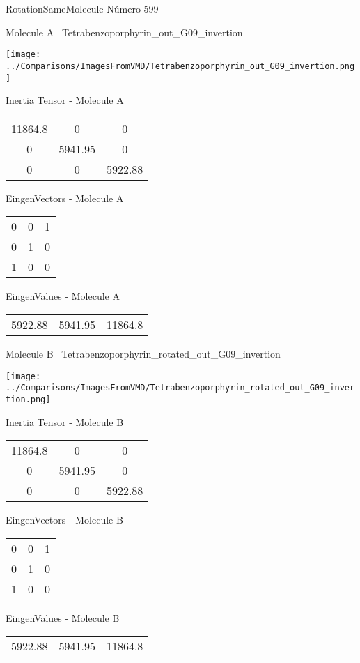 \vtab[-3cm]
\begin{center}
{\large RotationSameMolecule \tab Número 599}
\end{center}
\begin{multicols}{2}
\begin{center}

Molecule A \
Tetrabenzoporphyrin\_out\_G09\_invertion

\texttt{[image: ../Comparisons/ImagesFromVMD/Tetrabenzoporphyrin\_out\_G09\_invertion.png]}

Inertia Tensor - Molecule A \\
\begin{tabular}{|c c c|}
11864.8	 & 	0	 & 	0	 \\
0	 & 	5941.95	 & 	0	 \\
0	 & 	0	 & 	5922.88
\end{tabular}

\vtab
 EingenVectors - Molecule A     \\
\begin{tabular}{|c c c|}
0	 & 	0	 & 	1	 \\
0	 & 	1	 & 	0	 \\
1	 & 	0	 & 	0
\end{tabular}

\vtab
 EingenValues - Molecule A     \\
\begin{tabular}{|c c c|}
5922.88	 & 	5941.95	 & 	11864.8	 \\
\end{tabular}
\columnbreak

Molecule B \
Tetrabenzoporphyrin\_rotated\_out\_G09\_invertion

\texttt{[image: ../Comparisons/ImagesFromVMD/Tetrabenzoporphyrin\_rotated\_out\_G09\_invertion.png]}

Inertia Tensor - Molecule B \\
\begin{tabular}{|c c c|}
11864.8	 & 	0	 & 	0	 \\
0	 & 	5941.95	 & 	0	 \\
0	 & 	0	 & 	5922.88
\end{tabular}

\vtab
 EingenVectors - Molecule B     \\
\begin{tabular}{|c c c|}
0	 & 	0	 & 	1	 \\
0	 & 	1	 & 	0	 \\
1	 & 	0	 & 	0
\end{tabular}

\vtab
 EingenValues - Molecule B     \\
\begin{tabular}{|c c c|}
5922.88	 & 	5941.95	 & 	11864.8	 \\
\end{tabular}

\end{center}
\end{multicols}

